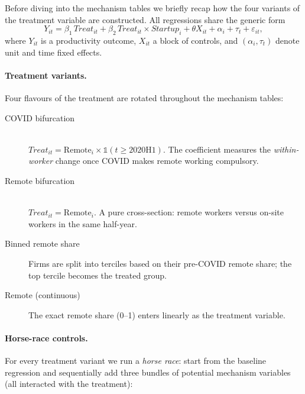 \documentclass{article}
\begin{document}
\begin{landscape}

\iffalse
Before diving into the mechanism tables we briefly recap how the four
variants of the treatment variable are constructed.  All regressions share
the generic form
\begin{equation*}
  Y_{it} = \beta_1\,\textit{Treat}_{it} + \beta_2\,\textit{Treat}_{it}\times\textit{Startup}_i + \theta X_{it} + \alpha_i + \tau_t + \varepsilon_{it},
\end{equation*}
where $Y_{it}$ is a productivity outcome, $X_{it}$ a block of controls, and
$(\alpha_i,\tau_t)$ denote unit and time fixed effects.

\paragraph{Treatment variants.}  Four flavours of the treatment are rotated
throughout the mechanism tables:
\begin{description}
  \item[COVID bifurcation]~\\
    \( \textit{Treat}_{it}=\text{Remote}_i\times\mathds{1}(t\ge 2020\text{H}1) \).  The
    coefficient measures the \emph{within‐worker} change once COVID makes
    remote working compulsory.

  \item[Remote bifurcation]~\\
    \( \textit{Treat}_{it}=\text{Remote}_i \).  A pure cross-section: remote
    workers versus on-site workers in the same half-year.

  \item[Binned remote share]  Firms are split into terciles based on their
    pre-COVID remote share; the top tercile becomes the treated group.

  \item[Remote (continuous)]  The exact remote share (0–1) enters linearly as
    the treatment variable.
\end{description}

\paragraph{Horse-race controls.}  For every treatment variant we run a
\emph{horse race}: start from the baseline regression and sequentially add
three bundles of potential mechanism variables (all interacted with the
treatment):


\end{landscape}
\end{document}
